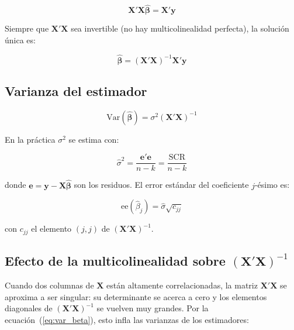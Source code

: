 \documentclass[12pt, letterpaper]{article}
\begin{document}
\begin{equation}
  \mathbf{X'X}\hat{\boldsymbol{\beta}} = \mathbf{X'y}
  \label{eq:normales}
\end{equation}

\noindent Siempre que $\mathbf{X'X}$ sea invertible (no hay multicolinealidad
perfecta), la solución única es:

\begin{equation}
  \hat{\boldsymbol{\beta}} = (\mathbf{X'X})^{-1}\mathbf{X'y}
  \label{eq:betahat}
\end{equation}

\subsection{Varianza del estimador}

\begin{equation}
  \text{Var}(\hat{\boldsymbol{\beta}})
    = \sigma^2 (\mathbf{X'X})^{-1}
  \label{eq:var_beta}
\end{equation}

\noindent En la práctica $\sigma^2$ se estima con:

\begin{equation}
  \hat{\sigma}^2
    = \frac{\mathbf{e'e}}{n - k}
    = \frac{\text{SCR}}{n - k}
  \label{eq:sigma2}
\end{equation}

\noindent donde $\mathbf{e} = \mathbf{y} - \mathbf{X}\hat{\boldsymbol{\beta}}$
son los residuos. El error estándar del coeficiente $j$-ésimo es:

\begin{equation}
  \text{ee}(\hat{\beta}_j)
    = \hat{\sigma}\sqrt{c_{jj}}
  \label{eq:ee_j}
\end{equation}

\noindent con $c_{jj}$ el elemento $(j,j)$ de $(\mathbf{X'X})^{-1}$.

\subsection{Efecto de la multicolinealidad sobre $(\mathbf{X'X})^{-1}$}

Cuando dos columnas de $\mathbf{X}$ están altamente correlacionadas, la matriz
$\mathbf{X'X}$ se aproxima a ser singular: su determinante se acerca a cero y
los elementos diagonales de $(\mathbf{X'X})^{-1}$ se vuelven muy grandes. Por
la ecuación~(\ref{eq:var_beta}), esto infla las varianzas de los estimadores:
\end{document}
